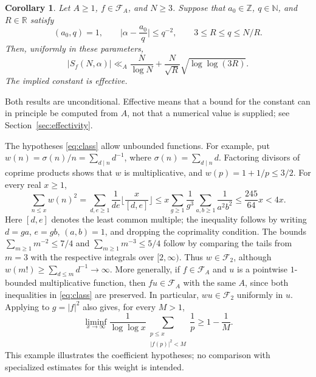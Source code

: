 \documentclass[11pt]{amsart}
\numberwithin{equation}{section}
\numberwithin{figure}{section}
\newtheorem{corollary}[lemma]{Corollary}
\theoremstyle{definition}
\newcommand{\Z}{\mathbb{Z}}
\newcommand{\R}{\mathbb{R}}
\newcommand{\N}{\mathbb{N}}
\newcommand{\FA}{\mathcal F_A}
\begin{document}
\begin{corollary}\label{cor:R}
Let $A\ge1$, $f\in\FA$, and $N\ge3$. Suppose that $a_0\in\Z$, $q\in\N$,
and $R\in\R$ satisfy
\begin{equation}\label{eq:R-approx}
 (a_0,q)=1,\qquad
 \bigg|\alpha-\frac{a_0}{q}\bigg|\le q^{-2},\qquad
 3\le R\le q\le N/R.
\end{equation}
Then, uniformly in these parameters,
\begin{equation}\label{eq:R-bound}
 |S_f(N,\alpha)|
 \ll_A \frac{N}{\log N}
       +\frac{N}{\sqrt R}\sqrt{\log\log(3R)}.
\end{equation}
The implied constant is effective.
\end{corollary}

Both results are unconditional. Effective means that a bound for the
constant can in principle be computed from $A$, not that a numerical
value is supplied; see Section~\ref{sec:effectivity}.

The hypotheses \eqref{eq:class} allow unbounded functions. For example,
put $w(n)=\sigma(n)/n=\sum_{d\mid n}d^{-1}$, where
$\sigma(n)=\sum_{d\mid n}d$. Factoring divisors of coprime products
shows that $w$ is multiplicative, and $w(p)=1+1/p\le3/2$. For every
real $x\ge1$,
\[
 \sum_{n\le x}w(n)^2
 =\sum_{d,e\ge1}\frac1{de}\Big\lfloor\frac x{[d,e]}\Big\rfloor
 \le x\sum_{g\ge1}\frac1{g^3}\sum_{a,b\ge1}\frac1{a^2b^2}
 \le\frac{245}{64}x<4x.
\]
Here $[d,e]$ denotes the least common multiple; the inequality follows
by writing $d=ga$, $e=gb$, $(a,b)=1$, and dropping the coprimality
condition. The bounds $\sum_{m\ge1}m^{-2}\le7/4$ and
$\sum_{m\ge1}m^{-3}\le5/4$ follow by comparing the tails from $m=3$
with the respective integrals over $[2,\infty)$. Thus
$w\in\mathcal F_2$, although
$w(m!)\ge\sum_{d\le m}d^{-1}\to\infty$. More generally, if
$f\in\FA$ and $u$ is a pointwise $1$-bounded multiplicative function,
then $fu\in\FA$ with the same $A$, since both inequalities in
\eqref{eq:class} are preserved. In particular, $wu\in\mathcal F_2$
uniformly in $u$. Applying \cite[Lemma~1]{DD2} to $g=|f|^2$ also gives, for every $M>1$,
\[
 \liminf_{x\to\infty}\frac{1}{\log\log x}
 \sum_{\substack{p\le x\\ |f(p)|^2<M}}\frac1p
 \ge 1-\frac1M.
\]
This example illustrates the coefficient hypotheses;
no comparison with specialized estimates for this weight is intended.
\end{document}

